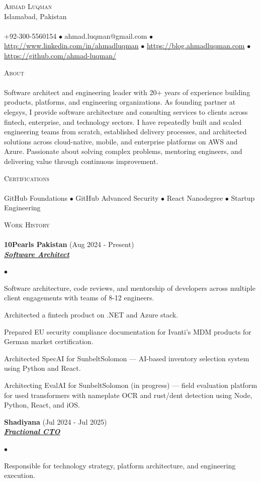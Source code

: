 \documentclass{article}
\newcommand{\lineunder}{\vspace*{-8pt} \\ \hspace*{-18pt} \hrulefill \\}
\newcommand{\header}[1]{{\hspace*{-15pt}\vspace*{6pt} \textsc{#1}} \vspace*{-6pt} \lineunder}
\newcommand{\employer}[3]{{ \textbf{#1} (#2)\\ \underline{\textbf{\emph{#3}}}\\  }}
\newcommand{\contact}[3]{
\vspace*{-8pt}
\begin{center}
{\LARGE \scshape {#1}}\\
#2 \lineunder 
#3
\end{center}
\vspace*{-8pt}
}
\newenvironment{achievements}{\begin{list}{$\bullet$}{\topsep 0pt \itemsep -2pt}}{\vspace*{4pt}\end{list}}
\begin{document}
\small
\smallskip
\vspace*{-44pt}

\contact{Ahmad Luqman}
{Islamabad, Pakistan}
{+92-300-5560154 $\bullet$ ahmad.luqman@gmail.com $\bullet$ \url{http://www.linkedin.com/in/ahmadluqman} $\bullet$ \url{https://blog.ahmadluqman.com} $\bullet$ \url{https://github.com/ahmad-luqman/}}

\header{About}
Software architect and engineering leader with 20+ years of experience building products, platforms, and engineering organizations. As founding partner at elegsys, I provide software architecture and consulting services to clients across fintech, enterprise, and technology sectors. I have repeatedly built and scaled engineering teams from scratch, established delivery processes, and architected solutions across cloud-native, mobile, and enterprise platforms on AWS and Azure. Passionate about solving complex problems, mentoring engineers, and delivering value through continuous improvement.
\vspace*{6pt}

\header{Certifications}
GitHub Foundations $\bullet$ GitHub Advanced Security $\bullet$ React Nanodegree $\bullet$ Startup Engineering
\vspace*{6pt}

\header{Work History}
\employer{10Pearls Pakistan}{Aug 2024 - Present}{Software Architect}
	\begin{achievements}
	\item Software architecture, code reviews, and mentorship of developers across multiple client engagements with teams of 8-12 engineers.
	\item Architected a fintech product on .NET and Azure stack.
	\item Prepared EU security compliance documentation for Ivanti's MDM products for German market certification.
	\item Architected SpecAI for SunbeltSolomon --- AI-based inventory selection system using Python and React.
	\item Architecting EvalAI for SunbeltSolomon (in progress) --- field evaluation platform for used transformers with nameplate OCR and rust/dent detection using Node, Python, React, and iOS.
	\end{achievements}

\employer{Shadiyana}{Jul 2024 - Jul 2025}{Fractional CTO}
	\begin{achievements}
	\item Responsible for technology strategy, platform architecture, and engineering execution.
	\end{achievements}
\end{document}
